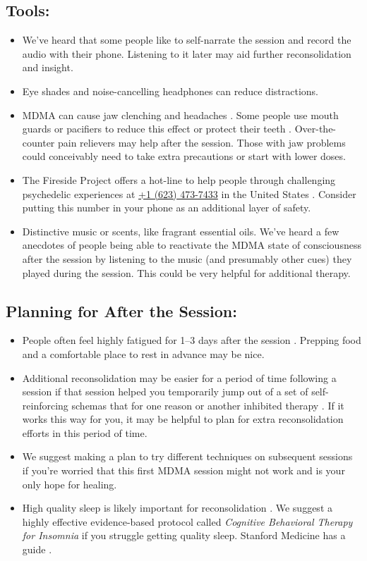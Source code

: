 \documentclass[12pt,letterpaper]{book}
\begin{document}
\subsection*{Tools:}
\begin{itemize}
    \item We've heard that some people like to self-narrate the session and record the audio with their phone. Listening to it later may aid further reconsolidation and insight.
    \item Eye shades and noise-cancelling headphones can reduce distractions.
    \item MDMA can cause jaw clenching and headaches \cite{mitchellMDMAClinicalTrial2,liechtiGender}. Some people use mouth guards or pacifiers to reduce this effect or protect their teeth \cite{emdeEmergency}. Over-the-counter pain relievers may help after the session. Those with jaw problems could conceivably need to take extra precautions or start with lower doses.
    \item The Fireside Project offers a hot-line to help people through challenging psychedelic experiences at \href{tel:1-623-473-7433}{+1 (623) 473-7433} in the United States \cite{firesideProject}. Consider putting this number in your phone as an additional layer of safety.
    \item Distinctive music or scents, like fragrant essential oils. We've heard a few anecdotes of people being able to reactivate the MDMA state of consciousness after the session by listening to the music (and presumably other cues) they played during the session. This could be very helpful for additional therapy.
\end{itemize}
\subsection*{Planning for After the Session:}
\begin{itemize}
    \item People often feel highly fatigued for 1–3 days after the session \cite{liechtiGender}. Prepping food and a comfortable place to rest in advance may be nice.
    \item Additional reconsolidation may be easier for a period of time following a session if that session helped you temporarily jump out of a set of self-reinforcing schemas that for one reason or another inhibited therapy . If it works this way for you, it may be helpful to plan for extra reconsolidation efforts in this period of time.
    \item We suggest making a plan to try different techniques on subsequent sessions if you're worried that this first MDMA session might not work and is your only hope for healing.
    \item High quality sleep is likely important for reconsolidation \cite{simon2020sleep}. We suggest a highly effective evidence-based protocol called \textit{Cognitive Behavioral Therapy for Insomnia} if you struggle getting quality sleep. Stanford Medicine has a guide \cite{stanfordSleep}.
\end{itemize}
\end{document}
